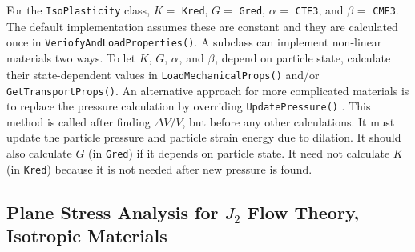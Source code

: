 \documentclass[11pt]{article}
\def\a#1{\alpha_{#1}}
\def\b#1{\beta_{#1}}
\def\code#1{{\small\tt #1}}
\begin{document}
For the \code{IsoPlasticity} class, $K=$ \code{Kred}, $G=$ \code{Gred}, $\a{}=$ \code{CTE3}, and $\b{}=$ \code{CME3}. The default implementation assumes these are constant and they are calculated once in \code{VeriofyAndLoadProperties()}. A subclass can implement non-linear materials two ways. To let $K$, $G$, $\a{}$, and $\b{}$, depend on particle state, calculate their state-dependent values in \code{LoadMechanicalProps()} and/or \code{GetTransportProps()}. An alternative approach for more complicated materials is to replace the pressure calculation by overriding \code{UpdatePressure()} . This method is called after finding ${\Delta V/V}$, but before any other calculations. It must update the particle pressure and particle strain energy due to dilation. It should also calculate $G$ (in \code{Gred}) if it depends on particle state. It need not calculate $K$ (in \code{Kred}) because it is not needed after new pressure is found. 

\subsection{Plane Stress Analysis for $J_2$ Flow Theory, Isotropic Materials}
\end{document}
